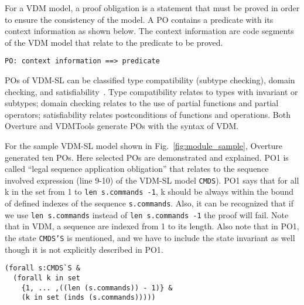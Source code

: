 
For a VDM model, a proof obligation is a statement that must be proved in order to ensure the consistency of the model. A PO contains a predicate with its context information as shown below. The context information are code segments of the VDM model that relate to the predicate to be proved.

\begin{mdframed}[roundcorner=5pt]
\begin{Verbatim}[fontsize=\small]
PO: context information ==> predicate
\end{Verbatim}
\end{mdframed}

POs of VDM-SL can be classified type compatibility (subtype checking), domain checking, and satisfiability~\cite{AL:97:POGV,Vermolen:2010:PCV:1774088.1774608}. Type compatibility relates to types with invariant or subtypes; domain checking relates to the use of partial functions and partial operators; satisfiability relates postconditions of functions and operations. Both Overture and VDMTools generate POs with the syntax of VDM.

For the sample VDM-SL model shown in Fig.~\ref{fig:module_sample}, Overture generated ten POs. Here selected POs are demonstrated and explained. PO1 is called ``legal sequence application obligation'' that relates to the sequence involved expression (line 9-10) of the VDM-SL model {\tt CMDS}). PO1 says that for all k in the set from 1 to {\tt len s.commands -1}, k should be always within the bound of defined indexes of the sequence {\tt s.commands}. Also, it can be recognized that if we use {\tt len s.commands} instead of {\tt len s.commands -1} the proof will fail. Note that in VDM, a sequence are indexed from 1 to its length. Also note that in PO1, the state {\tt CMDS'S} is mentioned, and we have to include the state invariant as well though it is not explicitly described in PO1.

\begin{mdframed}[roundcorner=5pt]
\begin{Verbatim}[fontsize=\small]
(forall s:CMDS`S & 
  (forall k in set 
    {1, ... ,((len (s.commands)) - 1)} & 
    (k in set (inds (s.commands)))))
\end{Verbatim}
\end{mdframed}

